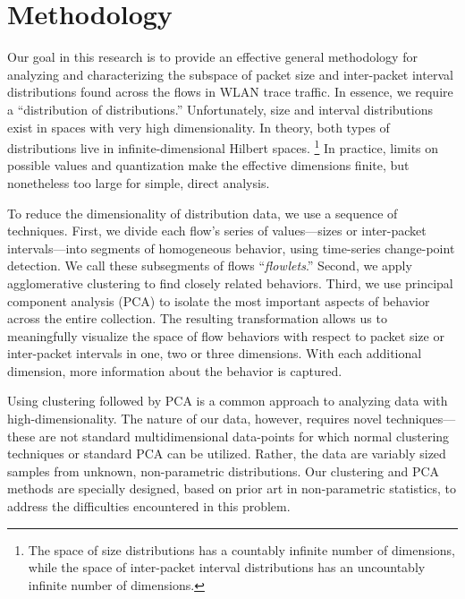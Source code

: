 \documentclass[conference]{IEEEtran}
\newcommand{\caps}[1]{{\small{#1}}}
\begin{document}
\section{Methodology}\label{sec:methodology}

Our goal in this research is to provide an effective general methodology for analyzing and characterizing the subspace of packet size and inter-packet interval distributions found across the flows in \caps{WLAN} trace traffic. In essence, we require a ``distribution of distributions.'' %
Unfortunately, size and interval distributions exist in spaces with very high dimensionality. In theory, both types of distributions live in infinite-dimensional Hilbert spaces.%
\footnote{The space of size distributions has a countably infinite number of dimensions, while the space of inter-packet interval distributions has an uncountably infinite number of dimensions.}
In practice, limits on possible values and quantization make the effective dimensions finite, but nonetheless too large for simple, direct analysis.%

To reduce the dimensionality of distribution data, we use a sequence of techniques.
First, we divide each flow's series of values---sizes or inter-packet intervals---into segments of homogeneous behavior, using time-series change-point detection. We call these subsegments of flows ``\textit{flowlets}.'' Second, we apply agglomerative clustering to find closely related behaviors. Third, we use principal component analysis (\caps{PCA}) to isolate the most important aspects of behavior across the entire collection. The resulting transformation allows us to meaningfully visualize the space of flow behaviors with respect to packet size or inter-packet intervals in one, two or three dimensions. With each additional dimension, more information about the behavior is captured. %

Using clustering followed by \caps{PCA} is a common approach to analyzing data with high-dimensionality. %
The nature of our data, however, requires novel techniques---these are not standard multidimensional data-points for which normal clustering techniques or standard \caps{PCA} can be utilized. Rather, the data are variably sized samples from unknown, non-parametric distributions. Our clustering and \caps{PCA} methods are specially designed, based on prior art in non-parametric statistics, to address the difficulties encountered in this problem.
\end{document}
